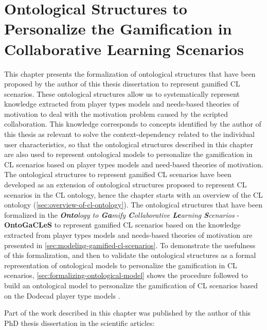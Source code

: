 \chapter[Ontological Structures to Personalize the Gamification in CL Scenarios]{Ontological Structures to Personalize the Gamification in Collaborative Learning Scenarios}
\label{chapter:ontogacles-1}

This chapter presents the formalization of ontological structures that have been proposed by the author of this thesis dissertation to represent gamified CL scenarios. These ontological structures allow us to systematically represent knowledge extracted from player types models and needs-based theories of motivation to deal with the motivation problem caused by the scripted collaboration. This knowledge corresponds to concepts identified by the author of this thesis as relevant to solve the context-dependency related to the individual user characteristics, so that the ontological structures described in this chapter are also used to represent ontological models to personalize the gamification in CL scenarios based on player types models and need-based theories of motivation. The ontological structures to represent gamified CL scenarios have been developed as an extension of ontological structures proposed to represent CL scenarios in the CL ontology, hence the chapter starts with an overview of the CL ontology (\autoref{sec:overview-of-cl-ontology}). The ontological structures that have been formalized in the \emph{\textbf{Onto}logy to \textbf{Ga}mify \textbf{C}ollaborative \textbf{Le}arning \textbf{S}cenarios} - \textbf{OntoGaCLeS} to represent gamified CL scenarios based on the knowledge extracted from player types models and needs-based theories of motivation are presented in \autoref{sec:modeling-gamified-cl-scenarios}. To demonstrate the usefulness of this formalization, and then to validate the ontological structures as a formal representation of ontological models to personalize the gamification in CL scenarios, \autoref{sec:formalizing-ontological-model} shows the procedure followed to build an ontological model to personalize the gamification of CL scenarios based on the Dodecad player type models \cite{Marczewski2015b}.

Part of the work described in this chapter was published by the author of this PhD thesis dissertation in the scientific articles:

